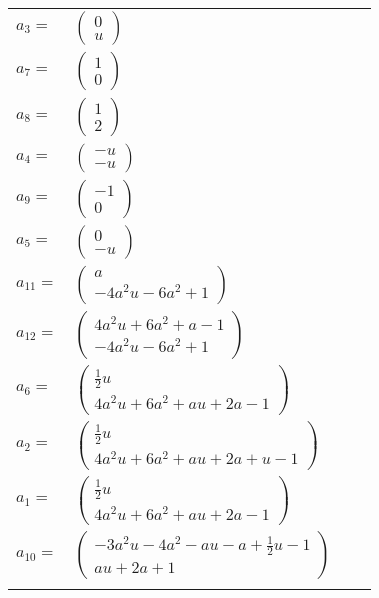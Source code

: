 \documentclass[1p]{elsarticle_modified}
\theoremstyle{definition}
\begin{document}
\begin{tabular}{m{7pt} m{180pt} m{7pt} m{180pt} }
\flushright $a_{3}=$&$\begin{pmatrix}0\\u\end{pmatrix}$ \\
\flushright $a_{7}=$&$\begin{pmatrix}1\\0\end{pmatrix}$ \\
\flushright $a_{8}=$&$\begin{pmatrix}1\\2\end{pmatrix}$ \\
\flushright $a_{4}=$&$\begin{pmatrix}- u\\- u\end{pmatrix}$ \\
\flushright $a_{9}=$&$\begin{pmatrix}-1\\0\end{pmatrix}$ \\
\flushright $a_{5}=$&$\begin{pmatrix}0\\- u\end{pmatrix}$ \\
\flushright $a_{11}=$&$\begin{pmatrix}a\\-4 a^2 u-6 a^2+1\end{pmatrix}$ \\
\flushright $a_{12}=$&$\begin{pmatrix}4 a^2 u+6 a^2+a-1\\-4 a^2 u-6 a^2+1\end{pmatrix}$ \\
\flushright $a_{6}=$&$\begin{pmatrix}\frac{1}{2} u\\4 a^2 u+6 a^2+a u+2 a-1\end{pmatrix}$ \\
\flushright $a_{2}=$&$\begin{pmatrix}\frac{1}{2} u\\4 a^2 u+6 a^2+a u+2 a+u-1\end{pmatrix}$ \\
\flushright $a_{1}=$&$\begin{pmatrix}\frac{1}{2} u\\4 a^2 u+6 a^2+a u+2 a-1\end{pmatrix}$ \\
\flushright $a_{10}=$&$\begin{pmatrix}-3 a^2 u-4 a^2- a u- a+\frac{1}{2} u-1\\a u+2 a+1\end{pmatrix}$\\&\end{tabular}
\end{document}
